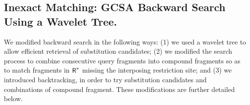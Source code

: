 




\subsection{Inexact Matching: GCSA Backward Search Using a Wavelet Tree.}




We modified backward search in the following ways:
(1) we used a wavelet tree to allow efficient retrieval of substitution candidates; (2) we modified the search process to combine consecutive query fragments into compound fragments so as to match fragments in $\mbox{\rm {\sf R}}^*$ missing the interposing restriction site; and (3) we introduced backtracking, in order to try substitution candidates and combinations of compound fragment. These modifications are further detailed below.

